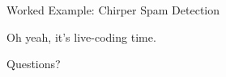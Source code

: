 \documentclass[8pt, aspectratio=169]{beamer}
\begin{document}
\begin{frame}{Worked Example: Chirper Spam Detection}
\begin{center}
Oh yeah, it's live-coding time.
\end{center}
\end{frame}

{
\begin{frame}[standout]
Questions?
\end{frame}
}
\end{document}
